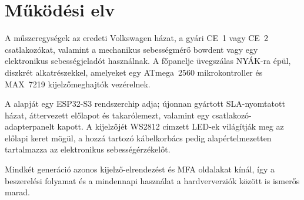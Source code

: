 \chapter{Működési elv}\label{ch:operating-principle}

A \ReplicaGenOne{} műszeregységek az eredeti Volkswagen házat, a gyári CE~1 vagy CE~2 csatlakozókat, valamint a mechanikus sebességmérő bowdent vagy egy elektronikus sebességjeladót használnak.
A \ReplicaGenOneShort{} főpanelje üvegszálas NYÁK-ra épül, diszkrét alkatrészekkel, amelyeket egy ATmega~2560 mikrokontroller és MAX~7219 kijelzőmeghajtók vezérelnek.

A \ReplicaNextLong{} alapját egy ESP32-S3 rendszerchip adja; újonnan gyártott SLA-nyomtatott házat, áttervezett előlapot és takarólemezt, valamint egy csatlakozó-adapterpanelt kapott.
A \ReplicaNextShort{} kijelzőjét WS2812 címzett LED-ek világítják meg az előlapi keret mögül, a hozzá tartozó kábelkorbács pedig alapértelmezetten tartalmazza az elektronikus sebességérzékelőt.

Mindkét generáció azonos kijelző-elrendezést és MFA oldalakat kínál, így a beszerelési folyamat és a mindennapi használat a hardververziók között is ismerős marad.
